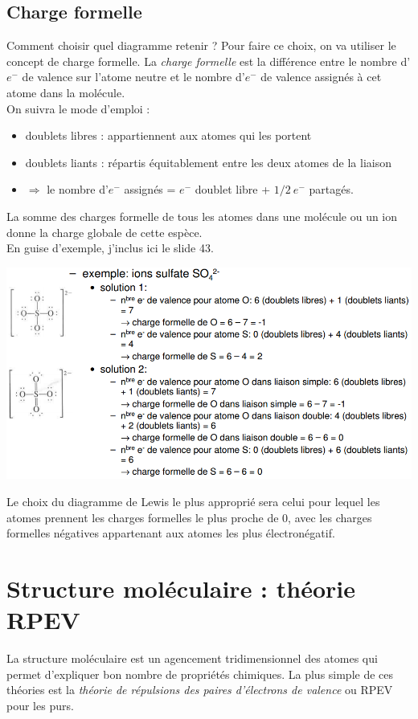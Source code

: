 \documentclass	[11pt, a4paper, openany]{book}
\begin{document}
\subsection{Charge formelle}
Comment choisir quel diagramme retenir ? Pour faire ce choix, on va utiliser le concept de charge formelle.
La \textit{charge formelle} est la différence entre le nombre d'$e^-$ de valence sur l'atome neutre et le nombre d'$e^-$ de valence assignés à cet atome dans la molécule.\\
On suivra le mode d'emploi :
\begin{itemize}
	\item doublets libres : appartiennent aux atomes qui les portent
	\item doublets liants : répartis équitablement entre les deux atomes de la liaison
	\item $\Rightarrow$ le nombre d'$e^-$ assignés = $e^-$ doublet libre + $1/2\ e^-$ partagés.
\end{itemize}
La somme des charges formelle de tous les atomes dans une molécule ou un ion donne la charge globale de cette espèce.\\
En guise d'exemple, j'inclus ici le slide 43.\\
\begin{center}
	\includegraphics[scale=0.55]{image11.png}\\
\end{center}
Le choix du diagramme de Lewis le plus approprié sera celui pour lequel les atomes prennent les charges formelles le plus proche de 0, avec les charges formelles négatives appartenant aux atomes les plus électronégatif.

\newpage
\section{Structure moléculaire : théorie RPEV}
La structure moléculaire est un agencement tridimensionnel des atomes qui permet d'expliquer bon nombre de propriétés chimiques. La plus simple de ces théories est la \textit{théorie de répulsions des paires d'électrons de valence} ou RPEV pour les purs.\\
\end{document}
